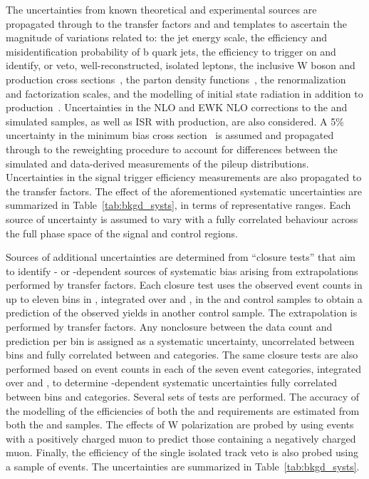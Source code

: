 The uncertainties from known theoretical and experimental sources are
propagated through to the transfer factors and \mht and \nb templates
to ascertain the magnitude of variations related to: the jet energy
scale, the efficiency and misidentification probability of b quark
jets, the efficiency to trigger on and identify, or veto,
well-reconstructed, isolated leptons, the inclusive W boson and \ttbar
production cross sections~\cite{}, the parton density
functions~\cite{}, the renormalization and factorization scales, and
the modelling of initial state radiation in addition to \ttbar
production~\cite{}. Uncertainties in the NLO and EWK NLO corrections
to the \wj and \zj simulated samples, as well as ISR with \ttbar
production, are also considered. A 5\% uncertainty in the minimum bias
cross section~\cite{} is assumed and propagated through to the
reweighting procedure to account for differences between the simulated
and data-derived measurements of the pileup
distributions. Uncertainties in the signal trigger efficiency
measurements are also propagated to the transfer factors. The effect
of the aforementioned systematic uncertainties are summarized in
Table~\ref{tab:bkgd_systs}, in terms of representative ranges.  Each
source of uncertainty is assumed to vary with a fully correlated
behaviour across the full phase space of the signal and control
regions.

Sources of additional uncertainties are determined from ``closure
tests'' that aim to identify \njet- or \scalht-dependent sources of
systematic bias arising from extrapolations performed by transfer
factors. Each closure test uses the observed event counts in up to
eleven bins in \scalht, integrated over \njet and \nb, in the \mj and
\mmj control samples to obtain a prediction of the observed yields in
another control sample. The extrapolation is performed by transfer
factors. Any nonclosure between the data count and prediction per
\scalht bin is assigned as a systematic uncertainty, uncorrelated
between \scalht bins and fully correlated between \njet and \nb
categories. The same closure tests are also performed based on event
counts in each of the seven \njet event categories, integrated over
\scalht and \nb, to determine \njet-dependent systematic uncertainties
fully correlated between \scalht bins and \nb categories. Several sets
of tests are performed. The accuracy of the modelling of the
efficiencies of both the \alphat and \bdphi requirements are estimated
from both the \mj and \mmj samples. The effects of W polarization are
probed by using \mj events with a positively charged muon to predict
those containing a negatively charged muon. Finally, the efficiency of
the single isolated track veto is also probed using a sample of \mj
events. The uncertainties are summarized in
Table~\ref{tab:bkgd_systs}.

